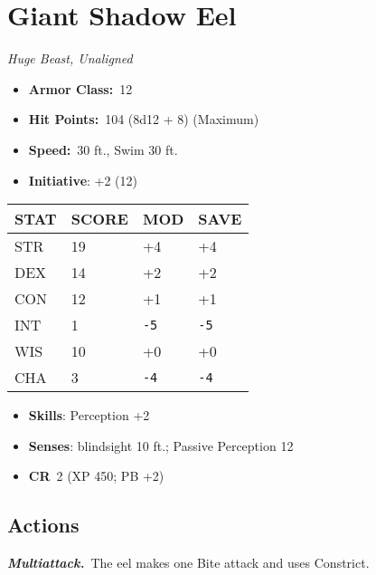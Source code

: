 \documentclass[10pt,twocolumn]{article}
\let\oldtextbf\textbf
\renewcommand{\textbf}[1]{\oldtextbf{{#1}}}
\providecommand{\tightlist}{
  \setlength{\itemsep}{4pt}
  \setlength{\topsep}{0pt}
  \setlength{\parsep}{0pt}
  \setlength{\parskip}{0pt}
  \setlength{\partopsep}{0pt}
}
\begin{document}
\section{Giant Shadow Eel}\label{giant-shadow-eel}

\emph{Huge Beast, Unaligned}

\setlength{\itemsep}{0pt}

\begin{itemize}
\tightlist
\item
  \textbf{Armor Class:}~12
\item
  \textbf{Hit Points:}~104 (8d12 + 8) (Maximum)
\item
  \textbf{Speed:}~30 ft., Swim 30 ft.
\item
  \textbf{Initiative}: +2 (12)
\end{itemize}

\begin{center}
{\sffamily\fontsize{8pt}{8pt}\selectfont
{}
\begin{tabular}{llll}
\toprule
\textbf{STAT} & \textbf{SCORE} & \textbf{MOD} & \textbf{SAVE} \\
\midrule
STR & 19 & +4 & +4 \\
DEX & 14 & +2 & +2 \\
CON & 12 & +1 & +1 \\
INT & 1 & \texttt{-5} & \texttt{-5} \\
WIS & 10 & +0 & +0 \\
CHA & 3 & \texttt{-4} & \texttt{-4} \\
\bottomrule
\end{tabular}}
\end{center}

\setlength{\itemsep}{0pt}

\begin{itemize}
\tightlist
\item
  \textbf{Skills}: Perception +2
\item
  \textbf{Senses}: blindsight 10 ft.; Passive Perception 12
\item
  \textbf{CR}~2 (XP 450; PB +2)
\end{itemize}

\subsection{Actions}\label{actions-5}

\emph{\textbf{Multiattack.}}~The eel makes one Bite attack and uses
Constrict.
\end{document}
